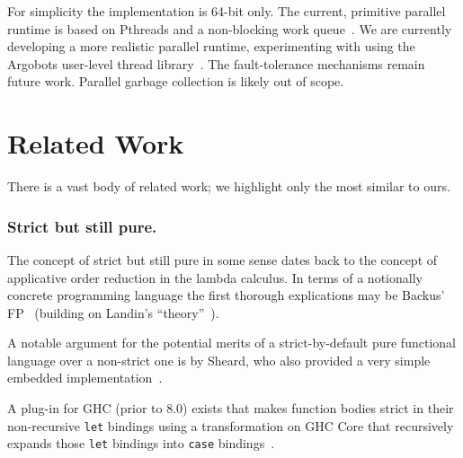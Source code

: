 \documentclass{llncs}
\begin{document}
For simplicity the implementation is 64-bit only.
%
The current, primitive parallel runtime is based on Pthreads and a
non-blocking work queue~\cite{Michael:1996}.  We are currently developing a
more realistic parallel runtime, experimenting with using the Argobots
user-level thread library~\cite{Seo:2015}.
%
%
The fault-tolerance mechanisms remain future work.
%
Parallel garbage collection is likely out of scope.
%


\section{Related Work}

There is a vast body of related work; we highlight only the most similar to ours.


\subsubsection{Strict but still pure.}
\vspace{-0.1in}
The concept of strict but still pure in some sense dates back to the concept
of applicative order reduction in the lambda calculus.  In terms of a
notionally concrete programming language the first thorough explications may
be Backus' FP~\cite{Backus:1978} (building on Landin's ``theory''~\cite{Landin64}).

A notable argument for the potential merits of a strict-by-default
pure functional language over a non-strict one is by Sheard, who also provided
a very simple embedded implementation~\cite{Sheard:2003}.

A plug-in for GHC (prior to 8.0) exists that makes function bodies strict in
their non-recursive \texttt{let} bindings using a transformation on GHC Core
that recursively expands those \texttt{let} bindings into \texttt{case}
bindings~\cite{Bolingbroke:2008,strict-ghc-plugin}.
\end{document}

